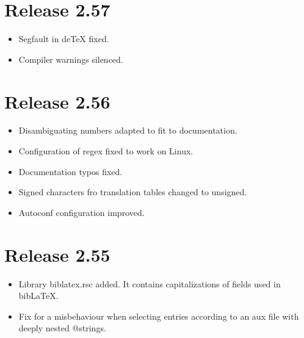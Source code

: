 \documentclass[11pt,a4paper]{scrartcl}
\newcommand\File[1]{\textsf{#1}}
\newenvironment{Release}[2]{\section*{Release #1}\begin{itemize}}{\end{itemize}}
\newenvironment{Fix}[1]{\item }{}
\newenvironment{New}[1]{\item }{}
\begin{document}
 \begin{Release}{2.57}{April 18, 2014}
  \begin{Fix}{gene}
    Segfault in deTeX fixed.
  \end{Fix}
  \begin{Fix}{gene}
    Compiler warnings silenced.
  \end{Fix}
 \end{Release}

 \begin{Release}{2.56}{April 14, 2014}
  \begin{Fix}{gene}
    Disambiguating numbers adapted to fit to documentation.
  \end{Fix}
  \begin{Fix}{gene}
    Configuration of regex fixed to work on Linux.
  \end{Fix}
  \begin{Fix}{gene}
    Documentation typos fixed.
  \end{Fix}
  \begin{Fix}{gene}
    Signed characters fro translation tables changed to unsigned.
  \end{Fix}
  \begin{Fix}{gene}
    Autoconf configuration improved.
  \end{Fix}
 \end{Release}

 \begin{Release}{2.55}{April 15, 2012}
  \begin{New}{gene}
    Library \File{biblatex.rsc} added. It contains capitalizations of
    fields used in bib\LaTeX.
  \end{New}
  \begin{Fix}{gene}
    Fix for a misbehaviour when selecting entries according to an aux file
    with deeply nested @strings.
  \end{Fix}
 \end{Release}
\end{document}
